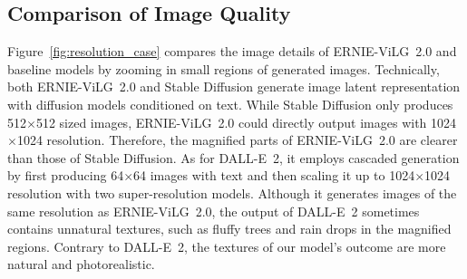 \documentclass[10pt,twocolumn,letterpaper]{article}
\begin{document}
\subsection{Comparison of Image Quality}\label{appx:definition}
Figure~\ref{fig:resolution_case} compares the image details of ERNIE-ViLG~2.0 and baseline models by zooming in small regions of generated images.
Technically, both ERNIE-ViLG~2.0 and Stable Diffusion generate image latent representation with diffusion models conditioned on text. While Stable Diffusion only produces 512$\times$512 sized images, ERNIE-ViLG~2.0 could directly output images with 1024$\times$1024 resolution. Therefore, the magnified parts of ERNIE-ViLG~2.0 are clearer than those of Stable Diffusion.
As for DALL-E~2, it employs cascaded generation by first producing 64$\times$64 images with text and then scaling it up to 1024$\times$1024 resolution with two super-resolution models.
Although it generates images of the same resolution as ERNIE-ViLG~2.0, the output of DALL-E~2 sometimes contains unnatural textures, such as fluffy trees and rain drops in the magnified regions.
Contrary to DALL-E~2, the textures of our model's outcome are more natural and photorealistic.
\end{document}
